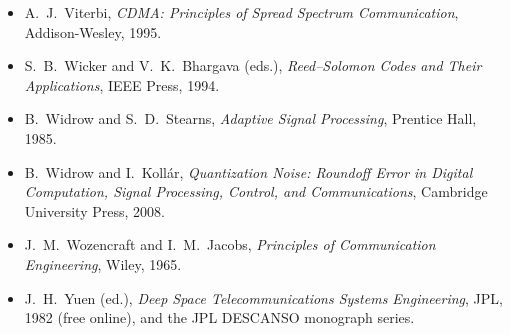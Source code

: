 \begin{itemize}[leftmargin=1.5em,itemindent=-1.5em,itemsep=1.5pt plus 1pt,parsep=0pt,topsep=4pt,label={}]
\item A.~J.~Viterbi, \emph{CDMA: Principles of Spread Spectrum Communication}, Addison-Wesley, 1995.
\item S.~B.~Wicker and V.~K.~Bhargava (eds.), \emph{Reed--Solomon Codes and Their Applications}, IEEE Press, 1994.
\item B.~Widrow and S.~D.~Stearns, \emph{Adaptive Signal Processing}, Prentice Hall, 1985.
\item B.~Widrow and I.~Koll\'ar, \emph{Quantization Noise: Roundoff Error in Digital Computation, Signal Processing, Control, and Communications}, Cambridge University Press, 2008.
\item J.~M.~Wozencraft and I.~M.~Jacobs, \emph{Principles of Communication Engineering}, Wiley, 1965.
\item J.~H.~Yuen (ed.), \emph{Deep Space Telecommunications Systems Engineering}, JPL, 1982 (free online), and the JPL DESCANSO monograph series.
\end{itemize}
\endgroup

